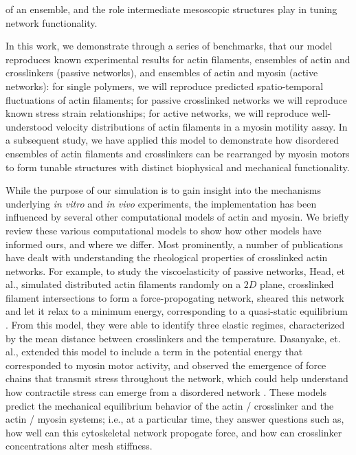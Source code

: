 \documentclass[12pt]{article}
\begin{document}
of an ensemble, and the role intermediate mesoscopic structures play in tuning network functionality.
\par
In this work, we demonstrate through a series of benchmarks, that our model 
reproduces known experimental results for actin
filaments, ensembles of actin and crosslinkers (passive networks), and ensembles of actin and myosin 
(active networks): 
for single polymers, we will reproduce predicted spatio-temporal fluctuations of actin filaments;
for passive crosslinked networks we will reproduce known stress strain
relationships; for active networks, we will reproduce well-understood velocity distributions of actin
filaments in a myosin motility assay. In a subsequent study, we have applied this model to 
demonstrate how disordered ensembles of 
actin filaments and crosslinkers can be rearranged by myosin motors to form tunable structures with distinct biophysical and
mechanical functionality\cite{freedman2016}.  
\par
While the purpose of our simulation is to gain insight into the mechanisms
underlying \textit{in vitro} and \textit{in vivo} experiments, the implementation 
has been influenced by several other computational models of actin and myosin. 
We briefly review these various computational models to show how other models have
informed ours, and where we differ.
Most prominently, a number of publications have dealt with understanding the rheological properties of crosslinked actin
networks\cite{mackintosh1995, head2003, wilhelm2003, kim2009}.  
For example, to study the viscoelasticity of passive networks,  Head, et al., simulated distributed actin filaments randomly 
on a $2D$ plane, crosslinked filament intersections to form a force-propogating network, sheared 
this network and let it relax to a minimum energy, corresponding to a quasi-static equilibrium \cite{head2003}. 
From this model, they were able to identify three elastic regimes,
characterized by the mean distance between crosslinkers and the temperature. 
Dasanyake, et. al., extended this model to include a term in the potential energy that corresponded to
myosin motor activity, and observed the emergence of force chains that transmit stress throughout the network,
which could help understand how contractile stress can emerge from a disordered network \cite{dasanyake2011}.
These models predict the mechanical equilibrium behavior of the actin / crosslinker and the actin / myosin
systems; i.e., at a particular time, they answer questions such as, how well can this cytoskeletal network propogate
force, and how can crosslinker concentrations alter mesh stiffness.
\end{document}
